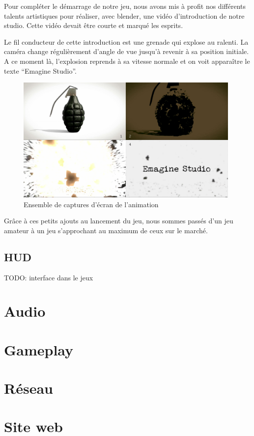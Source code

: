 \documentclass[11pt]{report}
\begin{document}
Pour compléter le démarrage de notre jeu, nous avons mis à profit nos différents talents artistiques pour réaliser, avec blender, une vidéo d'introduction de notre studio. Cette vidéo devait être courte et marqué les esprits.

Le fil conducteur de cette introduction est une grenade qui explose au ralenti. La caméra change régulièrement d'angle de vue jusqu'à revenir à sa position initiale. A ce moment là, l'explosion reprends à sa vitesse normale et on voit apparaître le texte ``Emagine Studio''.

\begin{figure}[htbp]
\centering
\includegraphics[width=11cm]{anim-eie.png}
\caption{Ensemble de captures d'écran de l'animation}
\end{figure}

Grâce à ces petits ajouts au lancement du jeu, nous sommes passés d’un jeu amateur à un jeu s'approchant au maximum de ceux sur le marché.

\section{HUD}

TODO: interface dans le jeux

\chapter{Audio}

\chapter{Gameplay}

\chapter{Réseau}

\chapter{Site web}
\end{document}
